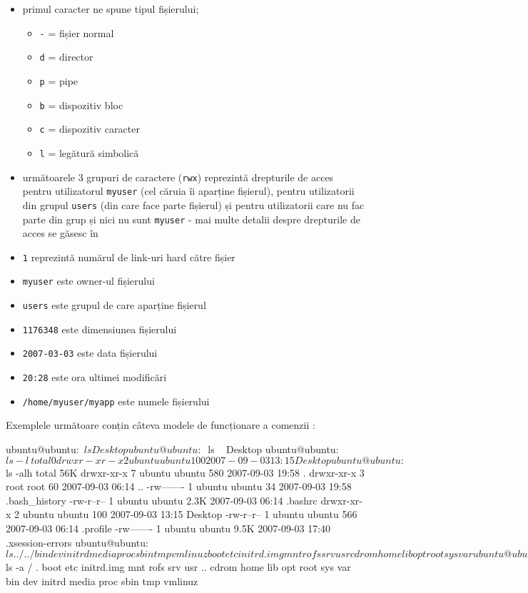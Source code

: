 \begin{itemize}
	\item primul caracter ne spune tipul fișierului;
	\begin{itemize}
		\item \texttt{-} = fișier normal
		\item \texttt{d} = director
		\item \texttt{p} = pipe
		\item \texttt{b} = dispozitiv bloc
		\item \texttt{c} = dispozitiv caracter
		\item \texttt{l} = legătură simbolică
	\end{itemize}
	\item următoarele 3 grupuri de caractere (\texttt{rwx}) reprezintă
		drepturile de acces pentru utilizatorul \texttt{myuser} (cel
		căruia îi aparține fișierul), pentru utilizatorii din grupul
		\texttt{users} (din care face parte fișierul) și pentru
		utilizatorii care nu fac parte din grup și nici nu sunt
		\texttt{myuser} - mai multe detalii despre drepturile de acces
		se găsesc în 
	\item \texttt{1} reprezintă numărul de link-uri hard către fișier
	\item \texttt{myuser} este owner-ul fișierului
	\item \texttt{users} este grupul de care aparține fișierul
	\item \texttt{1176348} este dimensiunea fișierului
	\item \texttt{2007-03-03} este data fișierului
	\item \texttt{20:28} este ora ultimei modificări
	\item \texttt{/home/myuser/myapp} este numele fișierului
\end{itemize}


Exemplele următoare conțin câteva modele de funcționare a comenzii :

\begin{screen}
ubuntu@ubuntu:~$ ls
Desktop
ubuntu@ubuntu:~$ ls ~
Desktop
ubuntu@ubuntu:~$ ls -l ~
total 0
drwxr-xr-x 2 ubuntu ubuntu 100 2007-09-03 13:15 Desktop
ubuntu@ubuntu:~$ ls -alh
total 56K
drwxr-xr-x 7 ubuntu ubuntu  580 2007-09-03 19:58 .
drwxr-xr-x 3 root   root         60 2007-09-03 06:14 ..
-rw------- 1 ubuntu ubuntu   34 2007-09-03 19:58 .bash_history
-rw-r--r-- 1 ubuntu ubuntu 2.3K 2007-09-03 06:14 .bashrc
drwxr-xr-x 2 ubuntu ubuntu  100 2007-09-03 13:15 Desktop
-rw-r--r-- 1 ubuntu ubuntu  566 2007-09-03 06:14 .profile
-rw------- 1 ubuntu ubuntu 9.5K 2007-09-03 17:40 .xsession-errors
ubuntu@ubuntu:~$ ls ../../
bin        dev   initrd          media  proc  sbin  tmp  vmlinuz
boot   etc   initrd.img  mnt        rofs  srv   usr
cdrom  home  lib             opt        root  sys   var
ubuntu@ubuntu:~$ ls -a /
.        boot   etc         initrd.img  mnt   rofs  srv  usr
..   cdrom  home        lib             opt   root  sys  var
bin  dev    initrd  media           proc  sbin  tmp  vmlinuz
\end{screen}

